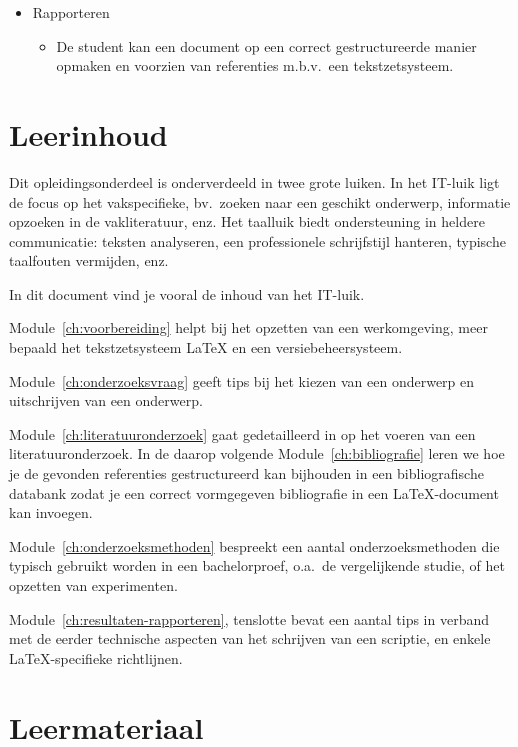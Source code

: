 \begin{itemize}
  \item Rapporteren
        \begin{itemize}
          \item De student kan een document op een correct gestructureerde manier opmaken en voorzien van referenties m.b.v.\ een tekstzetsysteem.
        \end{itemize}
\end{itemize}

\section{Leerinhoud}%
\label{sec:leerinhoud}

Dit opleidingsonderdeel is onderverdeeld in twee grote luiken. In het IT-luik ligt de focus op het vakspecifieke, bv.\ zoeken naar een geschikt onderwerp, informatie opzoeken in de vakliteratuur, enz. Het taalluik biedt ondersteuning in heldere communicatie: teksten analyseren, een professionele schrijfstijl hanteren, typische taalfouten vermijden, enz.

In dit document vind je vooral de inhoud van het IT-luik.

Module~\ref{ch:voorbereiding} helpt bij het opzetten van een werkomgeving, meer bepaald het tekstzetsysteem {\LaTeX} en een versiebeheersysteem.

Module~\ref{ch:onderzoeksvraag} geeft tips bij het kiezen van een onderwerp en uitschrijven van een onderwerp.

Module~\ref{ch:literatuuronderzoek} gaat gedetailleerd in op het voeren van een literatuuronderzoek. In de daarop volgende Module~\ref{ch:bibliografie} leren we hoe je de gevonden referenties gestructureerd kan bijhouden in een bibliografische databank zodat je een correct vormgegeven bibliografie in een {\LaTeX}-document kan invoegen.

Module~\ref{ch:onderzoeksmethoden} bespreekt een aantal onderzoeksmethoden die typisch gebruikt worden in een bachelorproef, o.a.\ de vergelijkende studie, of het opzetten van experimenten.

Module~\ref{ch:resultaten-rapporteren}, tenslotte bevat een aantal tips in verband met de eerder technische aspecten van het schrijven van een scriptie, en enkele {\LaTeX}-specifieke richtlijnen.

\section{Leermateriaal}%
\label{sec:leermateriaal}

